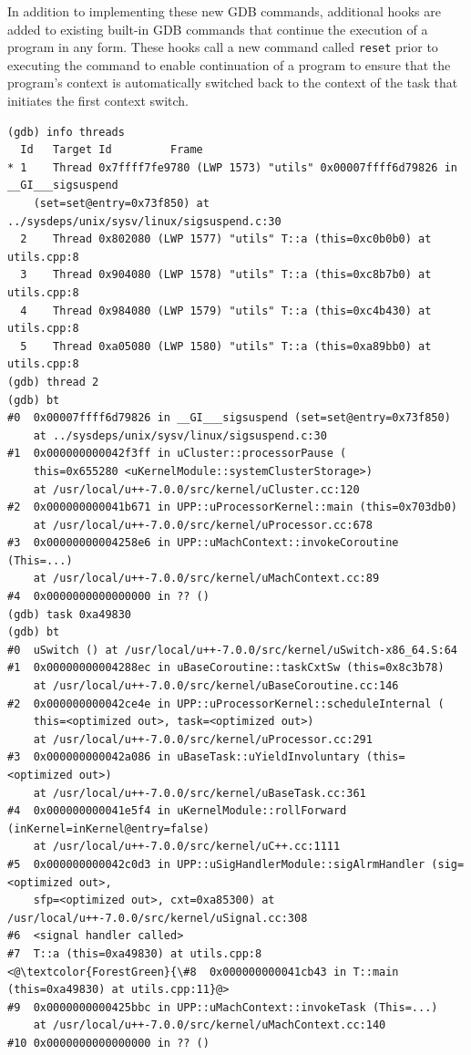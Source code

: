 In addition to implementing these new GDB commands, additional hooks are added
to existing built-in GDB commands that continue the execution of a program in any form. These hooks
call a new command called \verb|reset| prior to executing the command to enable
continuation of a program to ensure that
the program's context is automatically switched back to the context of the task
that initiates the first
context switch.
\begin{lstlisting}[caption={\text{pushtask} command}, label={pushtask}]
(gdb) info threads
  Id   Target Id         Frame
* 1    Thread 0x7ffff7fe9780 (LWP 1573) "utils" 0x00007ffff6d79826 in __GI___sigsuspend
    (set=set@entry=0x73f850) at ../sysdeps/unix/sysv/linux/sigsuspend.c:30
  2    Thread 0x802080 (LWP 1577) "utils" T::a (this=0xc0b0b0) at utils.cpp:8
  3    Thread 0x904080 (LWP 1578) "utils" T::a (this=0xc8b7b0) at utils.cpp:8
  4    Thread 0x984080 (LWP 1579) "utils" T::a (this=0xc4b430) at utils.cpp:8
  5    Thread 0xa05080 (LWP 1580) "utils" T::a (this=0xa89bb0) at utils.cpp:8
(gdb) thread 2
(gdb) bt
#0  0x00007ffff6d79826 in __GI___sigsuspend (set=set@entry=0x73f850)
    at ../sysdeps/unix/sysv/linux/sigsuspend.c:30
#1  0x000000000042f3ff in uCluster::processorPause (
    this=0x655280 <uKernelModule::systemClusterStorage>)
    at /usr/local/u++-7.0.0/src/kernel/uCluster.cc:120
#2  0x000000000041b671 in UPP::uProcessorKernel::main (this=0x703db0)
    at /usr/local/u++-7.0.0/src/kernel/uProcessor.cc:678
#3  0x00000000004258e6 in UPP::uMachContext::invokeCoroutine (This=...)
    at /usr/local/u++-7.0.0/src/kernel/uMachContext.cc:89
#4  0x0000000000000000 in ?? ()
(gdb) task 0xa49830
(gdb) bt
#0  uSwitch () at /usr/local/u++-7.0.0/src/kernel/uSwitch-x86_64.S:64
#1  0x00000000004288ec in uBaseCoroutine::taskCxtSw (this=0x8c3b78)
    at /usr/local/u++-7.0.0/src/kernel/uBaseCoroutine.cc:146
#2  0x000000000042ce4e in UPP::uProcessorKernel::scheduleInternal (
    this=<optimized out>, task=<optimized out>)
    at /usr/local/u++-7.0.0/src/kernel/uProcessor.cc:291
#3  0x000000000042a086 in uBaseTask::uYieldInvoluntary (this=<optimized out>)
    at /usr/local/u++-7.0.0/src/kernel/uBaseTask.cc:361
#4  0x000000000041e5f4 in uKernelModule::rollForward (inKernel=inKernel@entry=false)
    at /usr/local/u++-7.0.0/src/kernel/uC++.cc:1111
#5  0x000000000042c0d3 in UPP::uSigHandlerModule::sigAlrmHandler (sig=<optimized out>,
    sfp=<optimized out>, cxt=0xa85300) at /usr/local/u++-7.0.0/src/kernel/uSignal.cc:308
#6  <signal handler called>
#7  T::a (this=0xa49830) at utils.cpp:8
<@\textcolor{ForestGreen}{\#8  0x000000000041cb43 in T::main (this=0xa49830) at utils.cpp:11}@>
#9  0x0000000000425bbc in UPP::uMachContext::invokeTask (This=...)
    at /usr/local/u++-7.0.0/src/kernel/uMachContext.cc:140
#10 0x0000000000000000 in ?? ()
\end{lstlisting}

